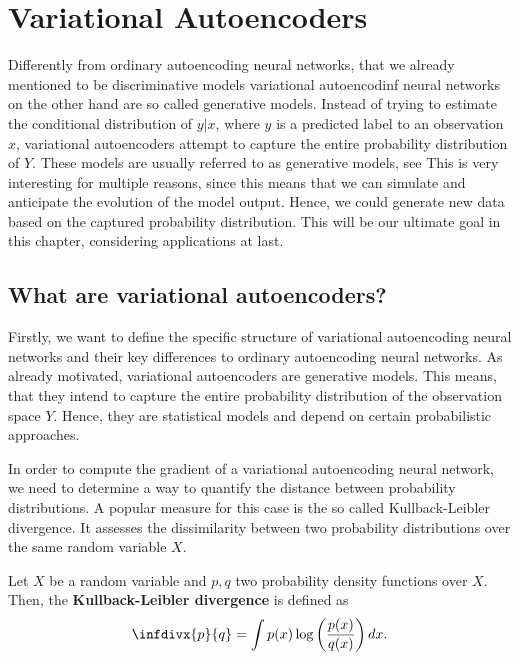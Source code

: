 \chapter{Variational Autoencoders}\label{vae}

Differently from ordinary autoencoding neural networks, that we already mentioned to be discriminative models variational autoencodinf neural networks on the other hand are so called generative models. Instead of trying to estimate the conditional distribution of $y|x$, where $y$ is a predicted label to an observation $x$, variational autoencoders attempt to capture the entire probability distribution of $Y$. These models are usually referred to as generative models, see \cite[chapter~5]{cinelli2021variational} This is very interesting for multiple reasons, since this means that we can simulate and anticipate the evolution of the model output. Hence, we could generate new data based on the captured probability distribution. This will be our ultimate goal in this chapter, considering applications at last.

\section{What are variational autoencoders?}
Firstly, we want to define the specific structure of variational autoencoding neural networks and their key differences to ordinary autoencoding neural networks. As already motivated, variational autoencoders are generative models. This means, that they intend to capture the entire probability distribution of the observation space $Y$. Hence, they are statistical models and depend on certain probabilistic approaches.


In order to compute the gradient of a variational autoencoding neural network, we need to determine a way to quantify the distance between probability distributions. A popular measure for this case is the so called Kullback-Leibler divergence. It assesses the dissimilarity between two probability distributions over the same 	random variable $X$.
\begin{definition}\label{def_kl_div}
Let $X$ be a random variable and $p, q$ two probability density functions over $X$. Then, the \textbf{Kullback-Leibler divergence} is defined as
\begin{align}
\infdivx{p}{q} = \int p(x) \log \left( \frac{p(x)}{q(x)}\right) dx.
\end{align}
\end{definition}


